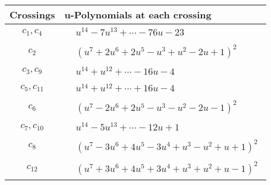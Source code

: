 \documentclass[1p]{elsarticle_modified}
\theoremstyle{definition}
\begin{document}
\begin{tabular}{m{50pt}|m{274pt}}
Crossings & \hspace{64pt}u-Polynomials at each crossing \\
\hline $$\begin{aligned}c_{1},c_{4}\end{aligned}$$&$\begin{aligned}
&u^{14}-7 u^{13}+\cdots-76 u-23
\end{aligned}$\\
\hline $$\begin{aligned}c_{2}\end{aligned}$$&$\begin{aligned}
&(u^7+2 u^6+2 u^5- u^3+u^2-2 u+1)^2
\end{aligned}$\\
\hline $$\begin{aligned}c_{3},c_{9}\end{aligned}$$&$\begin{aligned}
&u^{14}+u^{12}+\cdots-16 u-4
\end{aligned}$\\
\hline $$\begin{aligned}c_{5},c_{11}\end{aligned}$$&$\begin{aligned}
&u^{14}+u^{12}+\cdots+16 u-4
\end{aligned}$\\
\hline $$\begin{aligned}c_{6}\end{aligned}$$&$\begin{aligned}
&(u^7-2 u^6+2 u^5- u^3- u^2-2 u-1)^2
\end{aligned}$\\
\hline $$\begin{aligned}c_{7},c_{10}\end{aligned}$$&$\begin{aligned}
&u^{14}-5 u^{13}+\cdots-12 u+1
\end{aligned}$\\
\hline $$\begin{aligned}c_{8}\end{aligned}$$&$\begin{aligned}
&(u^7-3 u^6+4 u^5-3 u^4+u^3- u^2+u+1)^2
\end{aligned}$\\
\hline $$\begin{aligned}c_{12}\end{aligned}$$&$\begin{aligned}
&(u^7+3 u^6+4 u^5+3 u^4+u^3+u^2+u-1)^2
\end{aligned}$\\
\hline
\end{tabular}\\~\\
\end{document}
